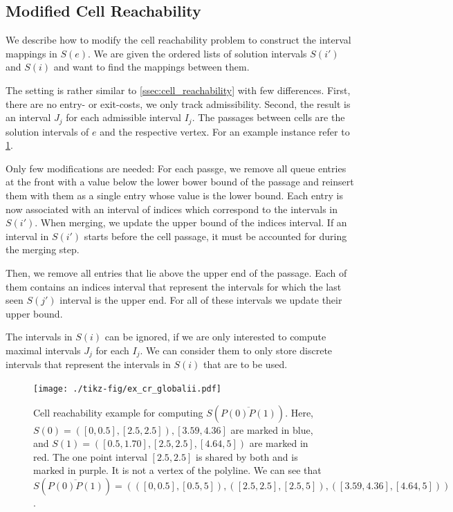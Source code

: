 \subsection{Modified Cell Reachability}
We describe how to modify the cell reachability problem to construct the interval mappings in \(S(e)\). We are given the ordered lists of solution intervals \(S(i')\) and \(S(i)\) and want to find the mappings between them. 

The setting is rather similar to \cref{ssec:cell_reachability} with few differences. First, there are no entry- or exit-costs, we only track admissibility. Second, the result is an interval \(J_j\) for each admissible interval \(I_j\). The passages between cells are the solution intervals of \(e\) and the respective vertex. For an example instance refer to \cref{fig:ex_cr_globalii}.

Only few modifications are needed: For each passge, we remove all queue entries at the front with a value below the lower bower bound of the passage and reinsert them with them as a single entry whose value is the lower bound. Each entry is now associated with an interval of indices which correspond to the intervals in \(S(i')\). When merging, we update the upper bound of the indices interval. If an interval in \(S(i')\) starts before the cell passage, it must be accounted for during the merging step.

Then, we remove all entries that lie above the upper end of the passage. Each of them contains an indices interval that represent  the intervals for which the last seen \(S(j')\) interval is the upper end. For all of these intervals we update their upper bound.

The intervals in \(S(i)\) can be ignored, if we are only interested to compute maximal intervals \(J_j\) for each \(I_j\). We can consider them to only store discrete intervals that represent the intervals in \(S(i)\) that are to be used.

\begin{figure}[htb]
  \centering
  \texttt{[image: ./tikz-fig/ex\_cr\_globalii.pdf]}
	\caption{Cell reachability example for computing \(S(\overline{P(0)P(1)})\). Here, \(S(0) = ([0, 0.5], [2.5, 2.5]), [3.59, 4.36]\) are marked in blue, and \(S(1) = ([0.5, 1.70], [2.5, 2.5], [4.64, 5])\) are marked in red. The one point interval \([2.5,2.5]\) is shared by both and is marked in purple. It is not a vertex of the polyline. We can see that \(S(\overline{P(0)P(1)}) = (([0,0.5], [0.5,5]), ([2.5,2.5],[2.5,5]), ([3.59,4.36],[4.64,5]))\).}
  \label{fig:ex_cr_globalii}
\end{figure}

